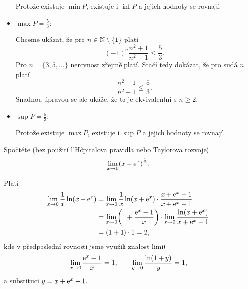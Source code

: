 \documentclass[answers]{exam}
\begin{document}
\begin{questions}
\begin{solution}
\begin{itemize}
        Protože existuje $\min P$, existuje i $\inf P$ a jejich hodnoty se rovnají.
      
      \item $\max P = \frac{5}{3}$:
      
        Chceme ukázat, že pro $n \in \mathbb{N} \setminus \{1\}$ platí 
        \begin{equation*}
          (-1)^n \frac{n^2 + 1}{n^2 - 1}
          \le
          \frac{5}{3}.
        \end{equation*}
        Pro $n = \{3, 5, \dots\}$ nerovnost zřejmě platí. Stačí tedy dokázat, že pro sudá $n$ platí
        \begin{equation*}
          \frac{n^2 + 1}{n^2 - 1}
          \le
          \frac{5}{3}.
        \end{equation*}
        Snadnou úpravou se ale ukáže, že to je ekvivalentní s $n \ge 2$.
        
      \item $\sup P = \frac{5}{3}$:
      
        Protože existuje $\max P$, existuje i $\sup P$ a jejich hodnoty se rovnají.

    \end{itemize}
  \end{solution}
  
  \question[2] Spočtěte (bez použití l'Hôpitalova pravidla nebo Taylorova rozvoje)
  \begin{equation*}
    \lim_{x \to 0} \parens{x + \exponential{x}}^{\frac{1}{x}}.
  \end{equation*}
  
  \begin{solution}
  Platí 
  \begin{align*}
    \lim_{x \to 0} \frac{1}{x} \ln \parens{x + \exponential{x}}
    &=
    \lim_{x \to 0} 
    \frac{1}{x} \ln \parens{x + \exponential{x}}
    \cdot
    \frac{x + \exponential{x} - 1}{x + \exponential{x} - 1}
    \\
    &=
    \lim_{x \to 0} \parens{1 + \frac{\exponential{x} - 1}{x}}
    \cdot
    \lim_{x \to 0} \frac{\ln \parens{x + \exponential{x}}}{x + \exponential{x} - 1}
    \\
    &=
    \parens{1 + 1} \cdot 1
    =
    2,
  \end{align*}
  kde v předposlední rovnosti jsme využili znalost limit
  \begin{equation*}
    \lim_{x \to 0} \frac{\mathrm{e}^{x} - 1}{x} = 1,
    \qquad
    \lim_{y \to 0} \frac{\ln(1 + y)}{y} = 1,
  \end{equation*}
  a substituci $y = x + \mathrm{e}^{x} - 1$.
  

\end{solution}
\end{questions}
\end{document}
